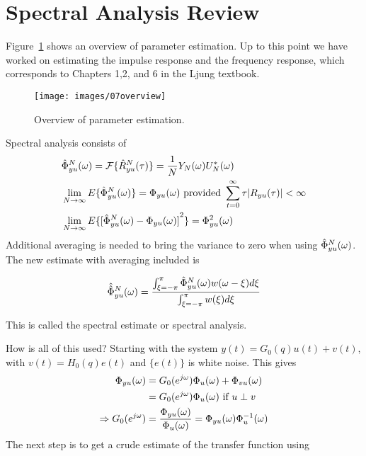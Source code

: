 \mainmatter%
\setcounter{page}{1}

\lectureseries[\course]{\course}

\date{October 15, 2009}

\setaddress%

\setcounter{lecture}{6}
\setcounter{chapter}{6}

%
\label{lec:7}

\section{Spectral Analysis Review}
Figure~\ref{fig:07overview} shows an overview of parameter estimation.
Up to this point we have worked on estimating the impulse response and the frequency response, which corresponds to Chapters 1,2, and 6 in the Ljung textbook.

\begin{figure}[ht!]
\centering
\texttt{[image: images/07overview]}
\caption{Overview of parameter estimation.}%
\label{fig:07overview}
\end{figure}

Spectral analysis consists of
\begin{align*}
&\hat{\Phi}_{yu}^N (\omega) = \mathcal{F}\{\hat{R}_{yu}^N (\tau)\} = \frac{1}{N}Y_N(\omega)U_N^*(\omega) \\
&\lim_{N\to\infty}E\{\hat{\Phi}_{yu}^N (\omega)\} = \Phi_{yu}(\omega) \text{~provided~} \sum_{t=0}^\infty \tau|R_{yu}(\tau)| < \infty \\
&\lim_{N\to\infty}E\{{[\hat{\Phi}_{yu}^N (\omega) - \Phi_{yu}(\omega)]}^2\} = \Phi_{yu}^2(\omega)
\end{align*}
Additional averaging is needed to bring the variance to zero when using $\hat{\Phi}_{yu}^N (\omega)$.
The new estimate with averaging included is

\begin{equation*}
\hat{\hat{\Phi}}_{yu}^N (\omega) = \frac{\int_{\xi=-\pi}^\pi \hat{\Phi}_{yu}^N (\omega) w(\omega-\xi)d\xi}{\int_{\xi=-\pi}^\pi w(\xi)d\xi}
\end{equation*}

This is called the spectral estimate or spectral analysis.

How is all of this used? Starting with the system $y(t)=G_0(q)u(t)+v(t)$, with $v(t)=H_0(q)e(t)$ and $\{e(t)\}$ is white noise.
This gives
\begin{align*}
\Phi_{yu}(\omega) &= G_0(e^{j\omega})\Phi_u(\omega) + \Phi_{vu}(\omega) \\
&= G_0(e^{j\omega})\Phi_u(\omega) \text{~if~} u\perp v \\
\Rightarrow G_0(e^{j\omega}) &= \frac{\Phi_{yu}(\omega)}{\Phi_u(\omega)} = \Phi_{yu}(\omega)\Phi_u^{-1}(\omega)
\end{align*}
The next step is to get a crude estimate of the transfer function using

